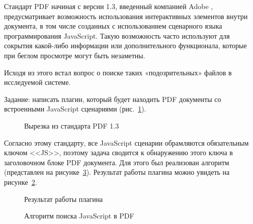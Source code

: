 Стандарт PDF начиная с версии 1.3, введенный компанией Adobe \cite{adobe}, предусматривает возможность использования интерактивных элементов внутри документа, в том числе созданных с использованием сценарного языка программирования JavaScript. Такую возможность часто используют для сокрытия какой-либо информации или дополнительного функционала, которые при беглом просмотре могут быть незаметны. 

Исходя из этого встал вопрос о поиске таких «подозрительных» файлов в исследуемой системе.

Задание: написать плагин, который будет находить PDF документы со встроенными JavaScript сценариями (рис.~\ref{lob_8:lob_8}).

\begin{figure}[!ht]
\caption{Вырезка из стандарта PDF 1.3}
\label{lob_8:lob_8}
\end{figure}

Согласно этому стандарту, все JavaScript сценарии обрамляются обязательным ключом <<JS>>, поэтому задача сводится к обнаружению этого ключа в заголовочном блоке PDF документа. Для этого был реализован алгоритм (представлен на рисунке~\ref{lob_9:lob_9}). Результат работы плагина можно увидеть на рисунке~\ref{lob_10:lob_10}.

\begin{figure}[!ht]
\caption{Результат работы плагина}
\label{lob_10:lob_10}
\end{figure}

\begin{figure}[!ht]
\caption{Алгоритм поиска JavaScript в PDF}
\label{lob_9:lob_9}
\end{figure}

\clearpage
